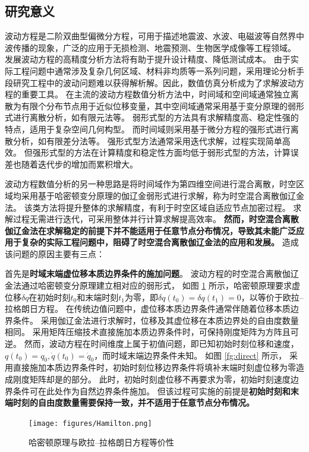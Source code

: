 
\subsection{研究意义}
波动方程是二阶双曲型偏微分方程\cite{bedford1994}，可用于描述地震波、水波、电磁波等自然界中波传播的现象，广泛的应用于无损检测、地震预测、生物医学成像等工程领域。
发展波动方程的高精度分析方法将有助于提升设计精度、降低测试成本。
由于实际工程问题中通常涉及复杂几何区域、材料非均质等一系列问题，采用理论分析手段研究工程中的波动问题难以获得解析解。因此，数值仿真分析成为了求解波动方程的重要工具。
在主流的波动方程数值分析方法中\cite{hughes2000}，时间域和空间域通常独立离散为有限个分布节点用于近似位移变量，其中空间域通常采用基于变分原理的弱形式进行离散分析，如有限元法等。
弱形式型的方法具有求解精度高、稳定性强的特点，适用于复杂空间几何构型。
而时间域则采用基于微分方程的强形式进行离散分析，如有限差分法等。
强形式型方法通常采用迭代求解，过程实现简单高效。
但强形式型的方法在计算精度和稳定性方面均低于弱形式型的方法，计算误差也随着迭代步的增加而累积增大。

波动方程数值分析的另一种思路是将时间域作为第四维空间进行混合离散，时空区域均采用基于哈密顿变分原理的伽辽金弱形式进行求解，称为时空混合离散伽辽金法。
该类方法将提升整体的求解精度，有利于时空区域自适应节点加密过程。
求解过程无需进行迭代，可采用整体并行计算求解提高效率。
\textbf{
然而，时空混合离散伽辽金法在求解稳定的前提下并不能适用于任意节点分布情况，导致其未能广泛应用于复杂的实际工程问题中，阻碍了时空混合离散伽辽金法的应用和发展。
}
造成该问题的原因主要有三点：

首先是\textbf{时域末端虚位移本质边界条件的施加问题}。
波动方程的时空混合离散伽辽金法通过哈密顿变分原理建立相对应的弱形式，
如图 \ref{fg:hamilton} 所示，哈密顿原理要求虚位移$\delta q$在初始时刻$t_0$和末端时刻$t_1$为零，即$\delta q(t_0)=\delta q(t_1)=0$，以等价于欧拉--拉格朗日方程\cite{arnold1978}。
在传统边值问题中，虚位移本质边界条件通常伴随着位移本质边界条件。
采用伽辽金法进行求解时，位移及其虚位移在本质边界处的自由度数量相同。
采用矩阵压缩技术直接施加本质边界条件时，可保持刚度矩阵为方阵且可逆。
然而，波动方程在时间维度上属于初值问题，即已知初始时刻位移和速度，$q(t_0)=q_0,\dot q(t_0) = \dot q_0$，而时域末端边界条件未知。
如图 \ref{fg:direct} 所示，
采用直接施加本质边界条件时，初始时刻位移边界条件将填补末端时刻虚位移为零造成刚度矩阵却是的部分。
此时，初始时刻虚位移不再要求为零，初始时刻速度边界条件可在此处作为自然边界条件施加。
但该过程可实施的前提是\textbf{初始时刻和末端时刻的自由度数量需要保持一致，并不适用于任意节点分布情况。}

\begin{figure}[!h]
    \centering 
    \texttt{[image: figures/Hamilton.png]}
    \caption{哈密顿原理与欧拉--拉格朗日方程等价性}
    \label{fg:hamilton}
\end{figure}


